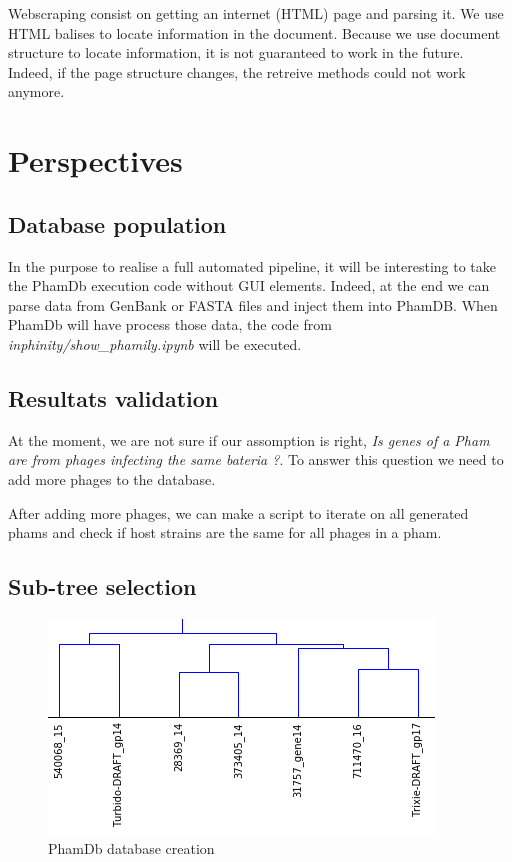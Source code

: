 \documentclass[a4paper,11pt]{report}
\begin{document}
Webscraping consist on getting an internet (HTML) page and parsing it. We use HTML balises to locate information in the document. Because we use document structure to locate information, it is not guaranteed to work in the future. Indeed, if the page structure changes, the retreive methods could not work anymore.

\section{Perspectives}
\subsection{Database population}

In the purpose to realise a full automated pipeline, it will be interesting to take the PhamDb execution code without GUI elements. Indeed, at the end we can parse data from GenBank or FASTA files and inject them into PhamDB. When PhamDb will have process those data, the code from \textit{inphinity/show\_phamily.ipynb} will be executed.

\subsection{Resultats validation}

At the moment, we are not sure if our assomption is right, \textit{Is genes of a Pham are from phages infecting the same bateria ?}. To answer this question we need to add more phages to the database.

After adding more phages, we can make a script to iterate on all generated phams and check if host strains are the same for all phages in a pham.

\subsection{Sub-tree selection}
\begin{figure}[H] 
	\begin{center}
		\includegraphics[scale=0.7]{img/tree_fig_4}
		\caption{PhamDb database creation}
	\end{center}
\end{figure}
\end{document}

